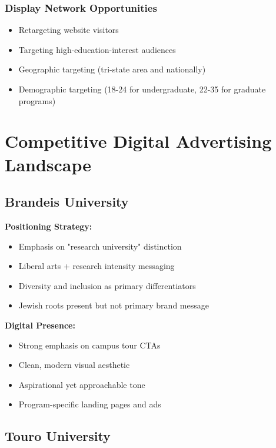 \documentclass[12pt,letterpaper]{article}
\begin{document}
\subsubsection{Display Network Opportunities}
\begin{itemize}[leftmargin=*]
    \item Retargeting website visitors
    \item Targeting high-education-interest audiences
    \item Geographic targeting (tri-state area and nationally)
    \item Demographic targeting (18-24 for undergraduate, 22-35 for graduate programs)
\end{itemize}

\section{Competitive Digital Advertising Landscape}

\subsection{Brandeis University}

\textbf{Positioning Strategy:}
\begin{itemize}[leftmargin=*]
    \item Emphasis on "research university" distinction
    \item Liberal arts + research intensity messaging
    \item Diversity and inclusion as primary differentiators
    \item Jewish roots present but not primary brand message
\end{itemize}

\textbf{Digital Presence:}
\begin{itemize}[leftmargin=*]
    \item Strong emphasis on campus tour CTAs
    \item Clean, modern visual aesthetic
    \item Aspirational yet approachable tone
    \item Program-specific landing pages and ads
\end{itemize}

\subsection{Touro University}
\end{document}
